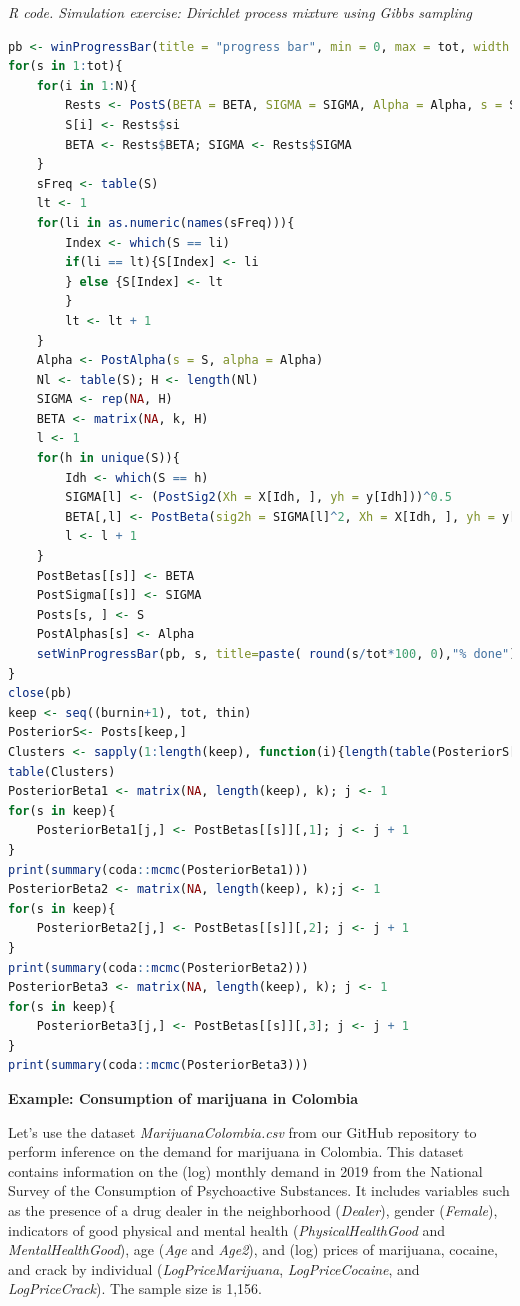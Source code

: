 \begin{tcolorbox}[enhanced,width=4.67in,center upper,
	fontupper=\large\bfseries,drop shadow southwest,sharp corners]
	\textit{R code. Simulation exercise: Dirichlet process mixture using Gibbs sampling}
	\begin{VF}
		\begin{lstlisting}[language=R]
pb <- winProgressBar(title = "progress bar", min = 0, max = tot, width = 300)
for(s in 1:tot){
	for(i in 1:N){
		Rests <- PostS(BETA = BETA, SIGMA = SIGMA, Alpha = Alpha, s = S, i = i)
		S[i] <- Rests$si
		BETA <- Rests$BETA; SIGMA <- Rests$SIGMA
	}
  	sFreq <- table(S)
	lt <- 1
	for(li in as.numeric(names(sFreq))){
		Index <- which(S == li)
		if(li == lt){S[Index] <- li
		} else {S[Index] <- lt
		}
		lt <- lt + 1
	}
	Alpha <- PostAlpha(s = S, alpha = Alpha)
	Nl <- table(S); H <- length(Nl)
	SIGMA <- rep(NA, H)
	BETA <- matrix(NA, k, H)
	l <- 1
	for(h in unique(S)){
		Idh <- which(S == h)
		SIGMA[l] <- (PostSig2(Xh = X[Idh, ], yh = y[Idh]))^0.5
		BETA[,l] <- PostBeta(sig2h = SIGMA[l]^2, Xh = X[Idh, ], yh = y[Idh])
		l <- l + 1
	}
	PostBetas[[s]] <- BETA
	PostSigma[[s]] <- SIGMA
	Posts[s, ] <- S
	PostAlphas[s] <- Alpha
	setWinProgressBar(pb, s, title=paste( round(s/tot*100, 0),"% done"))
}
close(pb)
keep <- seq((burnin+1), tot, thin)
PosteriorS<- Posts[keep,]
Clusters <- sapply(1:length(keep), function(i){length(table(PosteriorS[i,]))})
table(Clusters)
PosteriorBeta1 <- matrix(NA, length(keep), k); j <- 1
for(s in keep){
	PosteriorBeta1[j,] <- PostBetas[[s]][,1]; j <- j + 1
}
print(summary(coda::mcmc(PosteriorBeta1)))
PosteriorBeta2 <- matrix(NA, length(keep), k);j <- 1
for(s in keep){
	PosteriorBeta2[j,] <- PostBetas[[s]][,2]; j <- j + 1
}
print(summary(coda::mcmc(PosteriorBeta2)))
PosteriorBeta3 <- matrix(NA, length(keep), k); j <- 1
for(s in keep){
	PosteriorBeta3[j,] <- PostBetas[[s]][,3]; j <- j + 1
}
print(summary(coda::mcmc(PosteriorBeta3)))
\end{lstlisting}
	\end{VF}
\end{tcolorbox}

\textbf{Example: Consumption of marijuana in Colombia}

Let's use the dataset \textit{MarijuanaColombia.csv} from our GitHub repository to perform inference on the demand for marijuana in Colombia. This dataset contains information on the (log) monthly demand in 2019 from the National Survey of the Consumption of Psychoactive Substances. It includes variables such as the presence of a drug dealer in the neighborhood (\textit{Dealer}), gender (\textit{Female}), indicators of good physical and mental health (\textit{PhysicalHealthGood} and \textit{MentalHealthGood}), age (\textit{Age} and \textit{Age2}), and (log) prices of marijuana, cocaine, and crack by individual (\textit{LogPriceMarijuana}, \textit{LogPriceCocaine}, and \textit{LogPriceCrack}). The sample size is 1,156. 

